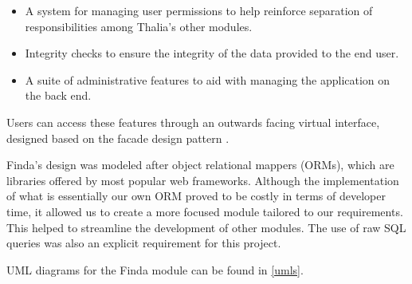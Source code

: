 \documentclass[main.tex]{subfiles}
\begin{document}
\begin{itemize}
\item A system for managing user permissions to help reinforce separation of responsibilities among Thalia's other modules. 
\item Integrity checks to ensure the integrity of the data provided to the end user.
\item A suite of administrative features to aid with managing the application on the back end.
\end{itemize}

Users can access these features through an outwards facing virtual interface, designed based on the facade design pattern \cite{designPatterns}.

Finda's design was modeled after object relational mappers (ORMs), which are libraries offered by most popular web frameworks. Although the implementation of what is essentially our own ORM proved to be costly in terms of developer time, it allowed us to create a more focused module tailored to our requirements. This helped to streamline the development of other modules. 
The use of raw SQL queries was also an explicit requirement for this project.

UML diagrams for the Finda module can be found in \ref{umls}.
\end{document}
